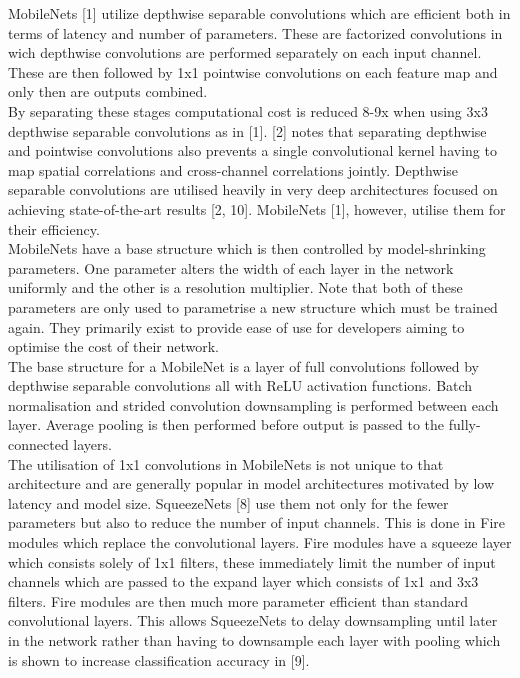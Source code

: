 \documentclass{article}
\begin{document}
MobileNets [1] utilize depthwise separable convolutions which are efficient both in terms of latency  and number of parameters. These are factorized convolutions in wich depthwise convolutions are performed separately on each input channel. These are then followed by 1x1 pointwise convolutions on each feature map and only then are outputs combined.\\ 

By separating these stages computational cost is reduced 8-9x when using 3x3 depthwise separable convolutions as in [1]. [2] notes that separating depthwise and pointwise convolutions also prevents a single convolutional kernel having to map spatial correlations and cross-channel correlations jointly. Depthwise separable convolutions are utilised heavily in very deep architectures focused on achieving state-of-the-art results [2, 10]. MobileNets [1], however, utilise them for their efficiency. \\

MobileNets have a base structure which is then controlled by model-shrinking parameters. One parameter alters the width of each layer in the network uniformly and the other is a resolution multiplier. Note that both of these parameters are only used to parametrise a new structure which must be trained again. They primarily exist to provide ease of use for developers aiming to optimise the cost of their network.\\

The base structure for a MobileNet is a layer of full convolutions followed by depthwise separable convolutions all with ReLU activation functions. Batch normalisation and strided convolution downsampling is performed between each layer. Average pooling is then performed before output is passed to the fully-connected layers.\\

The utilisation of 1x1 convolutions in MobileNets is not unique to that architecture and are generally popular in model architectures motivated by low latency and model size. SqueezeNets [8] use them not only for the fewer parameters but also to reduce the number of input channels. This is done in Fire modules which replace the convolutional layers. Fire modules have a squeeze layer which consists solely of 1x1 filters, these immediately limit the number of input channels which are passed to the expand layer which consists of 1x1 and 3x3 filters. Fire modules are then much more parameter efficient than standard convolutional layers. This allows SqueezeNets to delay downsampling until later in the network rather than having to downsample each layer with pooling which is shown to increase classification accuracy in [9].\\
\end{document}
